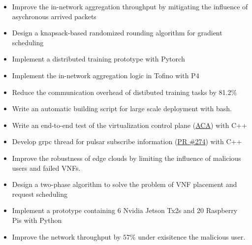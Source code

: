 \documentclass{resume}
\begin{document}
\begin{itemize}
  \item Improve the in-network aggregation throughput by mitigating the influence of asychronous arrived packets
  \item Design a knapsack-based randomized rounding algorithm for gradient scheduling
  \item Implement a distributed training prototype with Pytorch 
  \item Implement the in-network aggregation logic in Tofino with P4 %
  \item Reduce the communication overhead of distibuted training tasks by 81.2\%
\end{itemize}

\begin{itemize}
  \item Write an automatic building script for large scale deployment with bash.
  \item Write an end-to-end test of the virtualization control plane (\href{https://github.com/futurewei-cloud/alcor-control-agent}{ACA}) with C++
  \item Develop grpc thread for pulsar subscribe information (\href{https://github.com/futurewei-cloud/alcor-control-agent/pull/274}{PR \#274}) with C++
\end{itemize}

\begin{itemize}
  \item Improve the robustness of edge clouds by limiting the influence of malicious users and failed VNFs.
  \item Design a two-phase algorithm to solve the problem of VNF placement and request scheduling
  \item Implement a prototype containing 6 Nvidia Jetson Tx2s and 20 Raspberry Pis with Python
  \item Improve the network throughput by $57\%$ under exisitence the malicious user.
\end{itemize}
\end{document}
